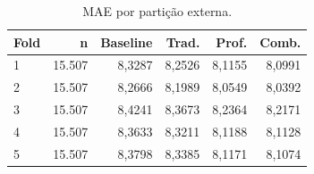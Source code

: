 \begin{table}[!htbp]\centering\small
\caption{MAE por partição externa.}
\begin{tabularx}{\linewidth}{Xrrrrr}
\toprule
Fold & n & Baseline & Trad. & Prof. & Comb. \\
\midrule
1 & 15.507 & 8,3287 & 8,2526 & 8,1155 & 8,0991 \\
2 & 15.507 & 8,2666 & 8,1989 & 8,0549 & 8,0392 \\
3 & 15.507 & 8,4241 & 8,3673 & 8,2364 & 8,2171 \\
4 & 15.507 & 8,3633 & 8,3211 & 8,1188 & 8,1128 \\
5 & 15.507 & 8,3798 & 8,3385 & 8,1171 & 8,1074 \\
\bottomrule\end{tabularx}
\par{}
\end{table}
